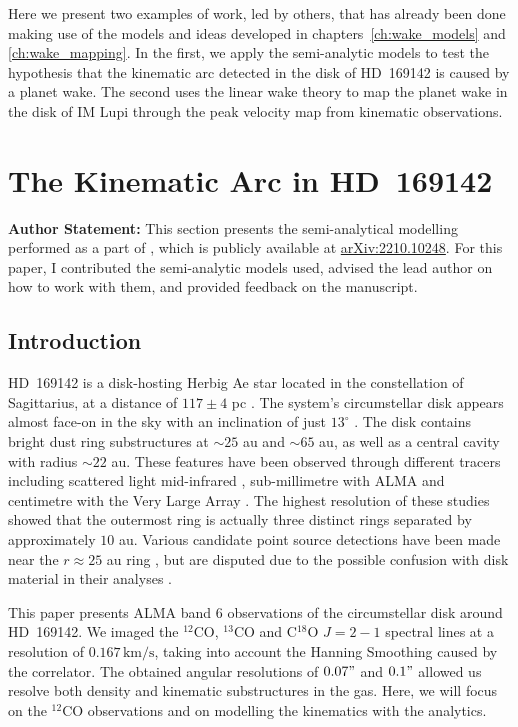 
Here we present two examples of work, led by others, that has already been done making use of the models and ideas developed in chapters~\ref{ch:wake_models} and \ref{ch:wake_mapping}.
In the first, we apply the semi-analytic models to test the hypothesis that the kinematic arc detected in the disk of  HD~169142 is caused by a planet wake.
The second uses the linear wake theory to map the planet wake in the disk of IM Lupi through the peak velocity map from kinematic observations.

\section{The Kinematic Arc in HD~169142} \label{sec:hd169}

\textbf{Author Statement:} This section presents the semi-analytical modelling performed as a part of \citet{garg2022}, which is publicly available at \href{https://arxiv.org/abs/2207.02869}{\url{arXiv:2210.10248}}.
For this paper, I contributed the semi-analytic models used, advised the lead author on how to work with them, and provided feedback on the manuscript.

\subsection{Introduction}

HD~169142 is a disk-hosting Herbig Ae star located in the constellation of Sagittarius, at a distance of $117 \pm 4$ pc \citep{brown2016}.
The system's circumstellar disk appears almost face-on in the sky with an inclination of just $13^\circ$ \citep{raman2006,panic2008}.
The disk contains bright dust ring substructures at $\sim25$ au and $\sim65$ au, as well as a central cavity with radius $\sim22$ au.
These features have been observed through different tracers including scattered light \citep{quanz2013a,momose2015,pohl2017,bertrang2018} mid-infrared \citep{honda2012}, sub-millimetre with ALMA \citep{fedele2017,macias2019,perez2019} and centimetre with the Very Large Array \citep{osorio2014}.
The highest resolution of these studies showed that the outermost ring is actually three distinct rings separated by approximately $10$ au.
Various candidate point source detections have been made near the $r \approx 25$ au ring \citep{biller2014,reggiani2014,gratton2019}, but are disputed due to the possible confusion with disk material in their analyses \citep{ligi2018}.

This paper presents ALMA band 6 observations of the circumstellar disk around HD~169142.
We imaged the $^{12}$CO, $^{13}$CO and C$^{18}$O $J=2-1$ spectral lines at a resolution of $0.167 \, \mathrm{km/s}$, taking into account the Hanning Smoothing caused by the correlator.
The obtained angular resolutions of $0.07"$ and $0.1"$ allowed us resolve both density and kinematic substructures in the gas. Here, we will focus on the $^{12}$CO observations and on modelling the kinematics with the analytics.

